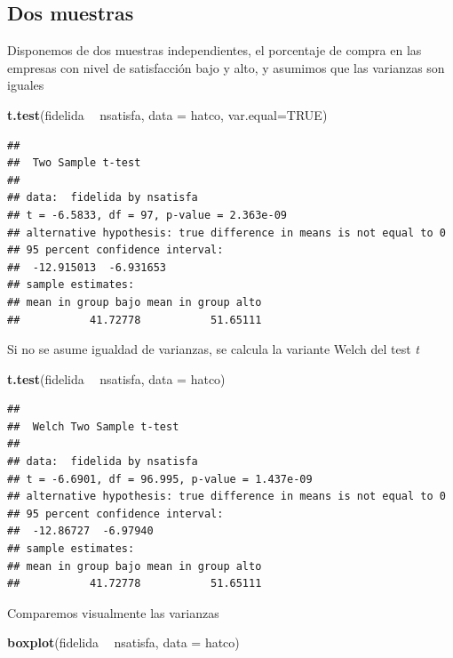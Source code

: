 \documentclass[]{book}
\newenvironment{Shaded}{\begin{snugshade}}{\end{snugshade}}
\newcommand{\DataTypeTok}[1]{\textcolor[rgb]{0.13,0.29,0.53}{#1}}
\newcommand{\KeywordTok}[1]{\textcolor[rgb]{0.13,0.29,0.53}{\textbf{#1}}}
\newcommand{\NormalTok}[1]{#1}
\newcommand{\OperatorTok}[1]{\textcolor[rgb]{0.81,0.36,0.00}{\textbf{#1}}}
\newcommand{\OtherTok}[1]{\textcolor[rgb]{0.56,0.35,0.01}{#1}}
\newcommand{\StringTok}[1]{\textcolor[rgb]{0.31,0.60,0.02}{#1}}
\begin{document}
\hypertarget{dos-muestras}{%
\subsection{Dos muestras}\label{dos-muestras}}

Disponemos de dos muestras independientes, el porcentaje de compra
en las empresas con nivel de satisfacción bajo y alto,
y asumimos que las varianzas son iguales

\begin{Shaded}
\begin{Highlighting}[]
\KeywordTok{t.test}\NormalTok{(fidelida }\OperatorTok{~}\StringTok{ }\NormalTok{nsatisfa, }\DataTypeTok{data =}\NormalTok{ hatco, }\DataTypeTok{var.equal=}\OtherTok{TRUE}\NormalTok{)}
\end{Highlighting}
\end{Shaded}

\begin{verbatim}
## 
##  Two Sample t-test
## 
## data:  fidelida by nsatisfa
## t = -6.5833, df = 97, p-value = 2.363e-09
## alternative hypothesis: true difference in means is not equal to 0
## 95 percent confidence interval:
##  -12.915013  -6.931653
## sample estimates:
## mean in group bajo mean in group alto 
##           41.72778           51.65111
\end{verbatim}

Si no se asume igualdad de varianzas, se calcula la variante Welch del test \emph{t}

\begin{Shaded}
\begin{Highlighting}[]
\KeywordTok{t.test}\NormalTok{(fidelida }\OperatorTok{~}\StringTok{ }\NormalTok{nsatisfa, }\DataTypeTok{data =}\NormalTok{ hatco)}
\end{Highlighting}
\end{Shaded}

\begin{verbatim}
## 
##  Welch Two Sample t-test
## 
## data:  fidelida by nsatisfa
## t = -6.6901, df = 96.995, p-value = 1.437e-09
## alternative hypothesis: true difference in means is not equal to 0
## 95 percent confidence interval:
##  -12.86727  -6.97940
## sample estimates:
## mean in group bajo mean in group alto 
##           41.72778           51.65111
\end{verbatim}

Comparemos visualmente las varianzas

\begin{Shaded}
\begin{Highlighting}[]
\KeywordTok{boxplot}\NormalTok{(fidelida }\OperatorTok{~}\StringTok{ }\NormalTok{nsatisfa, }\DataTypeTok{data =}\NormalTok{ hatco)}
\end{Highlighting}
\end{Shaded}
\end{document}
